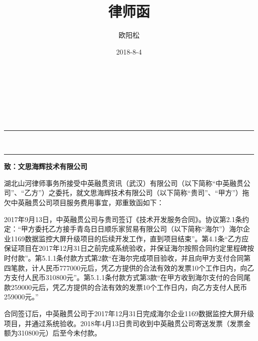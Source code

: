 \documentclass[fontset=none,zihao=-4]{ctexart}
\author{欧阳松}
\date{2018-8-4}
\title{律师函}
\begin{document}
\pagestyle{empty}
\begin{spacing}{1}
\begin{center}
\noindent{}\\
\vspace{.8ex}
\\
\vspace{5ex}
\\
\vspace{3ex}
\\
\vspace{3ex}

{ \hfill {}}

\noindent\rule{\textwidth}{0.6pt}\vspace*{-\baselineskip}\vspace*{2pt}\\ %
	\rule{\textwidth}{1.6pt} %
\end{center}
\end{spacing}


\noindent\textbf{致：文思海辉技术有限公司}\par
\vspace{1ex}

湖北山河律师事务所接受中英融贯资讯（武汉）有限公司（以下简称“中英融贯公司”、“乙方”）之委托，就文思海辉技术有限公司（以下简称“贵司”、“甲方”）拖欠中英融贯公司项目服务费用事宜，郑重致函如下：

2017年9月13日，中英融贯公司与贵司签订《技术开发服务合同》。协议第2.1条约定：“甲方委托乙方接手青岛日日顺乐家贸易有限公司（以下简称“海尔”）海尔企业1169数据监控大屏升级项目的后续开发工作，直到项目结束”。第4.1条“乙方应保证项目在2017年12月31日之前完成系统验收，并保证海尔按照合同约定里程碑按时付款”。第5.1.1条付款方式第2款“在海尔完成项目验收，并且向甲方支付合同第四笔款，计人民币777000元后，凭乙方提供的合法有效的发票10个工作日内，向乙方支付人民币310800元”。第5.1.1条付款方式第3款“在甲方收到海尔支付的合同尾款259000元后，凭乙方提供的合法有效的发票10个工作日内，向乙方支付人民币259000元。”

合同签订后，中英融贯公司于2017年12月31日完成海尔企业1169数据监控大屏升级项目，并通过系统验收。2018年4月13日贵司收到中英融贯公司寄送发票（发票金额为310800元）后至今未付款。
\end{document}
